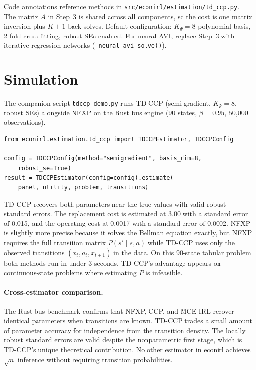 \documentclass[11pt]{article}
\begin{document}
Code annotations reference methods in \texttt{src/econirl/estimation/td\_ccp.py}.
The matrix $A$ in Step~3 is shared across all components, so the cost is one matrix inversion plus $K+1$ back-solves.
Default configuration: $K_\Psi = 8$ polynomial basis, 2-fold cross-fitting, robust SEs enabled.
For neural AVI, replace Step~3 with iterative regression networks (\texttt{\_neural\_avi\_solve()}).

\section{Simulation}

The companion script \texttt{tdccp\_demo.py} runs TD-CCP (semi-gradient, $K_\Psi = 8$, robust SEs) alongside NFXP on the Rust bus engine (90 states, $\beta = 0.95$, 50{,}000 observations).

\begin{lstlisting}[basicstyle=\footnotesize\ttfamily]
from econirl.estimation.td_ccp import TDCCPEstimator, TDCCPConfig

config = TDCCPConfig(method="semigradient", basis_dim=8,
    robust_se=True)
result = TDCCPEstimator(config=config).estimate(
    panel, utility, problem, transitions)
\end{lstlisting}

\begin{table}[H]
\centering
\caption{TD-CCP vs NFXP on the Rust bus engine (90 states, $\beta = 0.95$, 50{,}000 obs).}
\label{tab:tdccp_results}

\end{table}

TD-CCP recovers both parameters near the true values with valid robust standard errors.
The replacement cost is estimated at 3.00 with a standard error of 0.015, and the operating cost at 0.0017 with a standard error of 0.0002.
NFXP is slightly more precise because it solves the Bellman equation exactly, but NFXP requires the full transition matrix $P(s' \mid s,a)$ while TD-CCP uses only the observed transitions $(x_t, a_t, x_{t+1})$ in the data.
On this 90-state tabular problem both methods run in under 3 seconds.
TD-CCP's advantage appears on continuous-state problems where estimating $P$ is infeasible.

\paragraph{Cross-estimator comparison.}
The Rust bus benchmark confirms that NFXP, CCP, and MCE-IRL recover identical parameters when transitions are known.
TD-CCP trades a small amount of parameter accuracy for independence from the transition density.
The locally robust standard errors are valid despite the nonparametric first stage, which is TD-CCP's unique theoretical contribution.
No other estimator in econirl achieves $\sqrt{n}$ inference without requiring transition probabilities.
\end{document}
